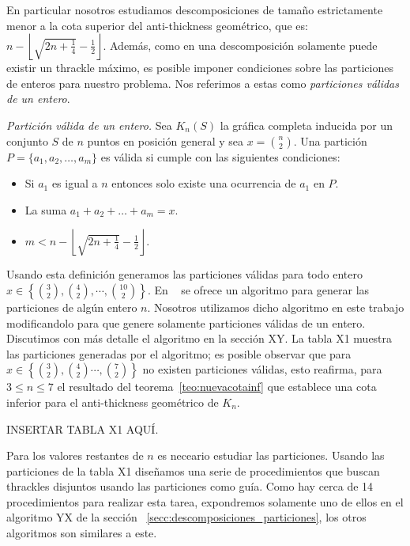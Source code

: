     En particular nosotros estudiamos descomposiciones de tamaño estrictamente menor
    a la cota superior del anti-thickness geométrico, que es:
    $n - \left\lfloor\sqrt{2n+\frac{1}{4}} - \frac{1}{2}\right\rfloor$. Además,
    como en una descomposición solamente puede existir un thrackle máximo, es
    posible imponer condiciones sobre las particiones de enteros para
    nuestro problema. Nos referimos a estas como \emph{particiones válidas de
    un entero}.
    \begin{definition}{\emph{Partición válida de un entero.}}
      Sea $K_n(S)$ la gráfica completa inducida por un conjunto $S$ de $n$
      puntos en posición general y sea $x=\binom{n}{2}$.
      Una partición $P=\{a_1,a_2,\dots,a_m\}$ es válida si cumple
      con las siguientes condiciones:
      \begin{itemize}
        \item Si $a_1$ es igual a $n$ entonces solo existe una ocurrencia de $a_1$ en $P$.
        \item La suma $a_1 + a_2 + \dots + a_m = x$.
        \item $m < n - \left\lfloor\sqrt{2n+\frac{1}{4}} - \frac{1}{2}\right\rfloor$.
      \end{itemize}
    \end{definition}

    Usando esta definición generamos las particiones válidas para todo entero
    $x\in \left\{ \binom{3}{2}, \binom{4}{2}, \cdots, \binom{10}{2}\right\}$.
    En ~\cite{Knuth2011} se ofrece un algoritmo para
    generar las particiones de algún entero $n$. Nosotros utilizamos
    dicho algoritmo en este trabajo modificandolo para que genere solamente
    particiones válidas de un entero. Discutimos con más detalle el algoritmo en
    la sección XY. La tabla X1 muestra las particiones generadas por el
    algoritmo; es posible observar que para $x\in \left\{\binom{3}{2},\binom{4}{2}
    \cdots,\binom{7}{2}\right\}$ no existen particiones válidas, esto reafirma,
    para $ 3\leq n\leq 7$ el resultado del teorema~\ref{teo:nuevacotainf}
    que establece una cota inferior para el anti-thickness geométrico de $K_n$.

    INSERTAR TABLA X1 AQUÍ.

    Para los valores restantes de $n$ es neceario estudiar las particiones.
    Usando las particiones de la tabla X1 diseñamos una serie de procedimientos
    que buscan thrackles disjuntos usando las particiones como guía. Como hay
    cerca de 14 procedimientos para realizar esta tarea, expondremos solamente
    uno de ellos en el algoritmo YX de la sección~
    \ref{secc:descomposiciones_particiones}, los otros algoritmos son similares
    a este.


